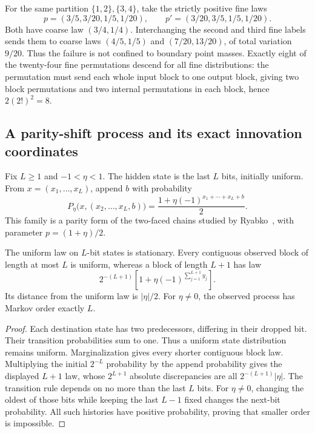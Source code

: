 \begin{example}\label{op:non-descent}
For the same partition \(\{1,2\},\{3,4\}\), take the strictly positive
fine laws
\[
 p=(3/5,3/20,1/5,1/20),\qquad
 p'=(3/20,3/5,1/5,1/20).
\]
Both have coarse law \((3/4,1/4)\).
Interchanging the second and third fine labels sends them to coarse
laws \((4/5,1/5)\) and \((7/20,13/20)\), of total variation \(9/20\).
Thus the failure is not confined to boundary point masses.
Exactly eight of the twenty-four fine permutations descend for all
fine distributions: the permutation must send each whole input block
to one output block, giving two block permutations and two internal
permutations in each block, hence \(2(2!)^2=8\).
\end{example}

\subsection{A parity-shift process and its exact innovation coordinates}
\label{op:parity}

Fix \(L\ge1\) and \(-1<\eta<1\).  The hidden state is the last \(L\) bits,
initially uniform.  From \(x=(x_1,\ldots,x_L)\), append \(b\) with
probability
\begin{equation}\label{op:parity-kernel}
 P_\eta\bigl(x,(x_2,\ldots,x_L,b)\bigr)
 =\frac{1+\eta(-1)^{x_1+\cdots+x_L+b}}2 .
\end{equation}
This family is a parity form of the two-faced chains studied by
Ryabko~\cite{op:ryabko}, with parameter \(p=(1+\eta)/2\).

\begin{proposition}\label{op:finite-depth}
The uniform law on \(L\)-bit states is stationary.  Every contiguous
observed block of length at most \(L\) is uniform, whereas a block of
length \(L+1\) has law
\[
 2^{-(L+1)}\left[1+\eta(-1)^{\sum_{j=1}^{L+1}y_j}\right].
\]
Its distance from the uniform law is \(|\eta|/2\).
For \(\eta\ne0\), the observed process has Markov order exactly \(L\).
\end{proposition}
\begin{proof}
Each destination state has two predecessors, differing in their dropped
bit.  Their transition probabilities sum to one.  Thus a uniform state
distribution remains uniform.  Marginalization gives every shorter
contiguous block law.  Multiplying the initial \(2^{-L}\) probability by
the append probability gives the displayed \(L+1\) law, whose \(2^{L+1}\)
absolute discrepancies are all \(2^{-(L+1)}|\eta|\).
The transition rule depends on no more than the last \(L\) bits.
For \(\eta\ne0\), changing the oldest of those bits while keeping the last
\(L-1\) fixed changes the next-bit probability.  All such histories have
positive probability, proving that smaller order is impossible.
\end{proof}

